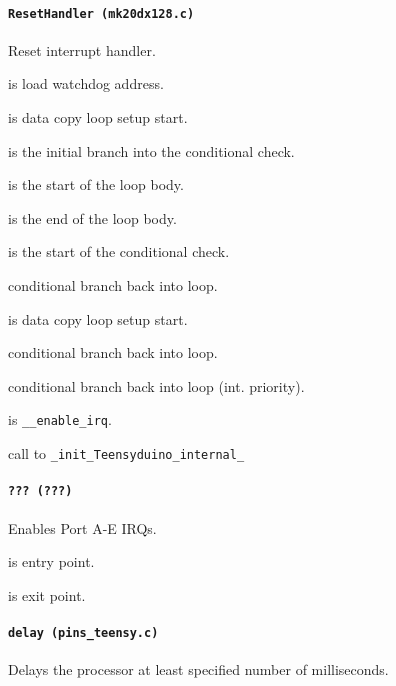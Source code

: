 \paragraph{\texttt{ResetHandler (mk20dx128.c)}} Reset interrupt handler.

 is load watchdog address.

\vspace{1em}

 is data copy loop setup start.

 is the initial branch into the conditional check.

 is the start of the loop body.

 is the end of the loop body.

 is the start of the conditional check.

 conditional branch back into loop.

\vspace{1em}

 is data copy loop setup start.

 conditional branch back into loop.

\vspace{1em}

 conditional branch back into loop (int. priority).

\vspace{1em}

 is \texttt{\_\_enable\_irq}.

 call to \texttt{\_init\_Teensyduino\_internal\_}

\paragraph{\texttt{??? (???)}} Enables Port A-E IRQs.

 is entry point.

 is exit point.

\paragraph{\texttt{delay (pins\_teensy.c)}} Delays the processor at least
specified number of milliseconds.

